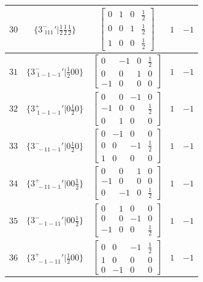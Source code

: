 \documentclass[fleqn,8pt]{jsarticle}
\begin{document}
\begin{longtable}{ccccc}
$ 30 $ & $ \{3^{-}_{\,\,111}{}'|\frac{1}{2} \frac{1}{2} \frac{1}{2}\} $ & $ \begin{bmatrix} 0 & 1 & 0 & \frac{1}{2} \\ 0 & 0 & 1 & \frac{1}{2} \\ 1 & 0 & 0 & \frac{1}{2} \end{bmatrix} $ & $ 1 $ & $ -1 $ \\ \hline
$ 31 $ & $ \{3^{-}_{\,\,1-1-1}{}'|\frac{1}{2} 0 0\} $ & $ \begin{bmatrix} 0 & -1 & 0 & \frac{1}{2} \\ 0 & 0 & 1 & 0 \\ -1 & 0 & 0 & 0 \end{bmatrix} $ & $ 1 $ & $ -1 $ \\ \hline
$ 32 $ & $ \{3^{+}_{\,\,1-1-1}{}'|0 \frac{1}{2} 0\} $ & $ \begin{bmatrix} 0 & 0 & -1 & 0 \\ -1 & 0 & 0 & \frac{1}{2} \\ 0 & 1 & 0 & 0 \end{bmatrix} $ & $ 1 $ & $ -1 $ \\ \hline
$ 33 $ & $ \{3^{-}_{\,\,-11-1}{}'|0 \frac{1}{2} 0\} $ & $ \begin{bmatrix} 0 & -1 & 0 & 0 \\ 0 & 0 & -1 & \frac{1}{2} \\ 1 & 0 & 0 & 0 \end{bmatrix} $ & $ 1 $ & $ -1 $ \\ \hline
$ 34 $ & $ \{3^{+}_{\,\,-11-1}{}'|0 0 \frac{1}{2}\} $ & $ \begin{bmatrix} 0 & 0 & 1 & 0 \\ -1 & 0 & 0 & 0 \\ 0 & -1 & 0 & \frac{1}{2} \end{bmatrix} $ & $ 1 $ & $ -1 $ \\ \hline
$ 35 $ & $ \{3^{-}_{\,\,-1-11}{}'|0 0 \frac{1}{2}\} $ & $ \begin{bmatrix} 0 & 1 & 0 & 0 \\ 0 & 0 & -1 & 0 \\ -1 & 0 & 0 & \frac{1}{2} \end{bmatrix} $ & $ 1 $ & $ -1 $ \\ \hline
$ 36 $ & $ \{3^{+}_{\,\,-1-11}{}'|\frac{1}{2} 0 0\} $ & $ \begin{bmatrix} 0 & 0 & -1 & \frac{1}{2} \\ 1 & 0 & 0 & 0 \\ 0 & -1 & 0 & 0 \end{bmatrix} $ & $ 1 $ & $ -1 $ \\ \hline

\end{longtable}
\end{document}
